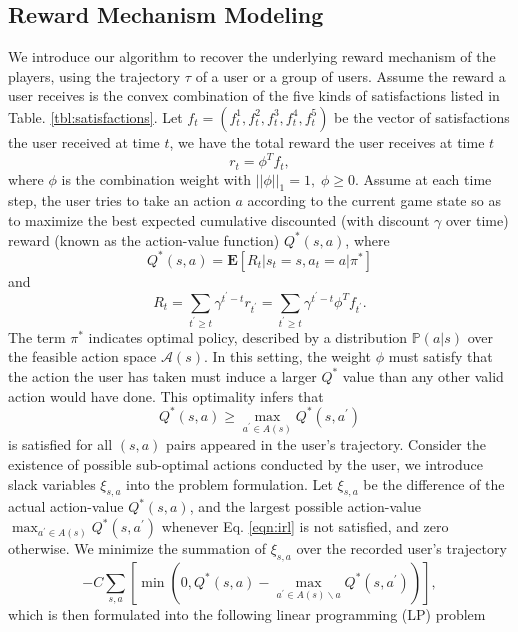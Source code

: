 \documentclass{sigchi}
\begin{document}
\subsection{Reward Mechanism Modeling}

We introduce our algorithm to recover the underlying reward mechanism of the players, using the trajectory $\tau$ of a user or a group of users. 
Assume the reward a user receives is the convex combination of the five kinds of satisfactions listed in Table. \ref{tbl:satisfactions}. 
Let $f_t=(f_t^1,f_t^2,f_t^3,f_t^4,f_t^5)$ be the vector of satisfactions the user received at time $t$, we have the total reward the user receives at time $t$ 
\begin{equation*}
r_t=\phi^Tf_t,
\end{equation*}
where $\phi$ is the combination weight with $||\phi||_1=1, \; \phi \geq 0$. Assume at each time step, the user tries to take an action $a$ according to the current game state so as to maximize the best expected cumulative discounted (with discount $\gamma$ over time) reward (known as the action-value function) $Q^\ast(s, a)$, where
$$Q^\ast(s,a)=\mathbf{E}[R_t | s_{t}=s, a_{t}=a | \pi^\ast]$$
and
$$R_t=\sum_{t^\prime\geq t}\gamma^{t^\prime-t}r_{t^\prime}=\sum_{t^\prime\geq t}\gamma^{t^\prime-t}\phi^Tf_{t^\prime}.$$
The term $\pi^\ast$ indicates optimal policy, described by a distribution $\mathbb{P}(a|s)$ over the feasible action space $\mathcal{A}(s)$. In this setting, the weight $\phi$ must satisfy that the action the user has taken must induce a larger $Q^\ast$ value than any other valid action would have done. This optimality infers that
\begin{equation}
Q^\ast(s,a) \geq \max_{a^\prime \in A(s)}Q^\ast(s,a^\prime) \label{eqn:irl}
\end{equation}
is satisfied for all $(s,a)$ pairs appeared in the user's trajectory. Consider the existence of possible sub-optimal actions conducted by the user, we introduce slack variables $\xi_{s,a}$ into the problem formulation. Let $\xi_{s,a}$ be the difference of the actual action-value $Q^\ast(s,a)$, and the largest possible action-value $\max_{a^\prime \in A(s)}Q^\ast(s,a^\prime)$ whenever Eq. \eqref{eqn:irl} is not satisfied, and zero otherwise. We minimize the summation of $\xi_{s,a}$ over the recorded user's trajectory
\begin{equation}
-C\sum_{s,a} \left[\min(0, Q^\ast(s,a) - \max_{a^\prime \in A(s)\backslash a}Q^\ast(s,a^\prime))\right], \label{eqn:slack}
\end{equation}
which is then formulated into the following linear programming (LP) problem
\end{document}
